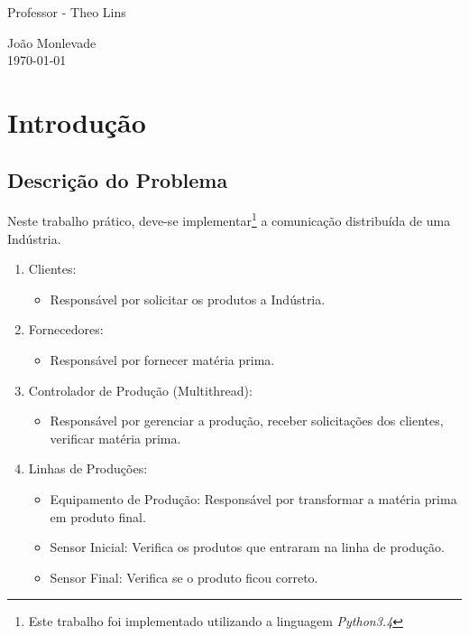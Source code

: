 \documentclass[brazil, a4paper,12pt]{article}
\begin{document}
\begin{titlepage}
  \begin{center}
    \begin{large}
      Professor - Theo Lins
    \end{large}
  \end{center}

  \vfill

  \begin{center}
    \begin{large}
      João Monlevade \\
      \today \\
    \end{large}
  \end{center}

\clearpage
\end{titlepage}

\tableofcontents
\newpage

\section{Introduç\~ao}

\subsection{Descriç\~ao do Problema}

\noindent Neste trabalho prático, deve-se implementar\footnote{Este trabalho foi implementado utilizando a linguagem \emph{Python3.4}} a comunicação distribuída de uma Indústria.

	\begin{enumerate}
		\item Clientes:
		\begin{itemize}
			\item Responsável por solicitar os produtos a Indústria.
		\end{itemize}
		
		\item Fornecedores:
		\begin{itemize}
			\item Responsável por fornecer matéria prima.
		\end{itemize}
		
		\item Controlador de Produção (Multithread):
		\begin{itemize}
			\item Responsável por gerenciar a produção, receber solicitações dos clientes, verificar
matéria prima.
		\end{itemize}
		
		\item Linhas de Produções:
		\begin{itemize}
			\item Equipamento de Produção: Responsável por transformar a matéria prima em
produto final.
			\item Sensor Inicial: Verifica os produtos que entraram na linha de produção.
			\item Sensor Final: Verifica se o produto ficou correto.
		\end{itemize}
	\end{enumerate}
	
\end{document}
